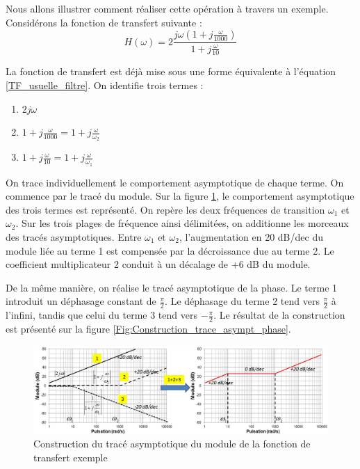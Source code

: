 	Nous allons illustrer comment réaliser cette opération à travers un exemple. Considérons la fonction de transfert suivante :
	\begin{equation*}
	H(\omega) = 2\frac{j\omega(1+j\frac{\omega}{1000})}{1+j\frac{\omega}{10}}
	\end{equation*}
	
	
	La fonction de transfert est déjà mise sous une forme équivalente à l'équation \ref{TF_usuelle_filtre}. On identifie trois termes :
	\begin{enumerate}
		\item $2j\omega$
		\item $1+j\frac{\omega}{1000}=1+j\frac{\omega}{\omega_{2}}$
		\item $1+j\frac{\omega}{10}=1+j\frac{\omega}{\omega_{1}}$\\
	\end{enumerate}
	
	 On trace individuellement le comportement asymptotique de chaque terme. On commence par le tracé du module. Sur la figure \ref{Fig:Construction_trace_asympt_module}, le comportement asymptotique des trois termes est représenté. On repère les deux fréquences de transition $\omega_{1}$ et $\omega_{2}$. Sur les trois plages de fréquence ainsi délimitées, on additionne les morceaux des tracés asymptotiques. Entre $\omega_{1}$ et $\omega_{2}$, l'augmentation en 20 dB/dec du module liée au terme 1 est compensée par la décroissance due au terme 2. Le coefficient multiplicateur 2 conduit à un décalage de +6 dB du module.
	 
	 De la même manière, on réalise le tracé asymptotique de la phase. Le terme 1 introduit un déphasage constant de $\frac{\pi}{2}$. Le déphasage du terme 2 tend vers $\frac{\pi}{2}$ à l'infini, tandis que celui du terme 3 tend vers $-\frac{\pi}{2}$. Le résultat de la construction est présenté sur la figure \ref{Fig:Construction_trace_asympt_phase}.
	 
	 \begin{figure}[h!]
	 	\centering
	 	\includegraphics[scale=0.5]{images/Constr_trace_asympt_Module.jpg}
	 	\caption{Construction du tracé asymptotique du module de la fonction de transfert exemple}	
	 	\label{Fig:Construction_trace_asympt_module} 
	 \end{figure}
 

